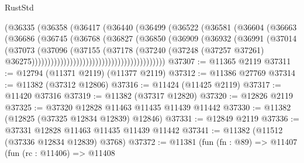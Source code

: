 \begin{lexlean}{RustStd}
\begin{coremodule}
                                        (@36335
                                          (@36358
                                            (@36417
                                              (@36440
                                                (@36499
                                                  (@36522
                                                    (@36581
                                                      (@36604
                                                        (@36663
                                                          (@36686
                                                            (@36745
                                                              (@36768
                                                                (@36827
                                                                  (@36850
                                                                    (@36909
                                                                      (@36932
                                                                        (@36991
                                                                          (@37014
                                                                            (@37073
                                                                              (@37096
                                                                                (@37155
                                                                                  (@37178
                                                                                    (@37240
                                                                                      (@37248
                                                                                        (@37257
                                                                                          @37261)
                                                                                        @36275))))))))))))))))))))))))))))))))))))))))))
@37307 := @11365 @2119
@37311 := @12794 (@11371 @2119) (@11377 @2119)
@37312 := @11386 @27769
@37314 := @11382 (@37312 @12806)
@37316 := @11424 (@11425 @2119)
@37317 := @11420 @37316
@37319 := @11382 (@37317 @12820)
@37320 := @12826 @2119
@37325 := @37320 @12828 @11463 @11435 @11439 @11442
@37330 := @11382 (@12825 (@37325 @12834 @12839) @12846)
@37331 := @12849 @2119
@37336 := @37331 @12828 @11463 @11435 @11439 @11442
@37341 := @11382 (@11512 (@37336 @12834 @12839) @3768)
@37372 := @11381
    (fun (fn : @89) =>
    @11407
      (fun (rc : @11406) =>
      @11408

\end{coremodule}
\end{lexlean}
